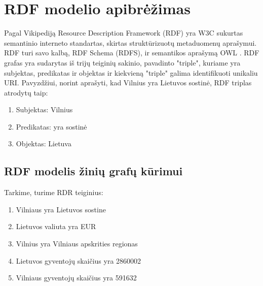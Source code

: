 \documentclass{VUMIFPSkursinis}
\begin{document}
\pagebreak

\section{RDF modelio apibrėžimas}
Pagal Vikipediją Resource Description Framework (RDF) yra W3C sukurtas semantinio interneto standartas, skirtas struktūrizuotų metaduomenų aprašymui. RDF turi savo kalbą, RDF Schema (RDFS), ir semantikos aprašymą OWL \cite{wiki:rdf}. RDF grafas yra sudarytas iš trijų teiginių sakinio, pavadinto "triple", kuriame yra subjektas, predikatas ir objektas ir kiekvieną "triple" galima identifikuoti unikaliu URI. Pavyzdžiui, norint aprašyti, kad Vilnius yra Lietuvos sostinė, RDF triplas atrodytų taip:
\begin{enumerate}
    \item Subjektas: Vilnius
    \item Predikatas: yra sostinė
    \item Objektas: Lietuva
    
\end{enumerate}

\subsection{RDF modelis žinių grafų kūrimui}

Tarkime, turime RDR teiginius:
\begin{enumerate}
    \item Vilniaus yra Lietuvos sostine
    \item Lietuvos valiuta yra EUR
    \item Vilnius yra Vilniaus apskrities regionas
    \item Lietuvos gyventojų skaičius yra 2860002
    \item Vilniaus gyventojų skaičius yra 591632
    
\end{enumerate}
\end{document}
